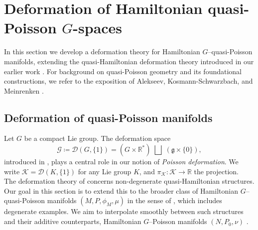 \documentclass[reqno]{amsart}
\theoremstyle{plain}
\theoremstyle{definition}
\newcommand{\R}{\mathbb{R}}
\newcommand{\too}{\longrightarrow}
\begin{document}
\section{Deformation of Hamiltonian quasi-Poisson $G$-spaces} \label{sec 2}
In this section we develop a deformation theory for Hamiltonian $G${--}quasi-Poisson manifolds, extending the quasi-Hamiltonian deformation theory introduced in our earlier work \cite{JMM2025deformations}. For background on quasi-Poisson geometry and its foundational constructions, we refer to the exposition of Alekseev, Kosmann-Schwarzbach, and Meinrenken \cite{alekseev2002quasi}.

\subsection{Deformation of quasi-Poisson manifolds}

Let $G$ be a compact Lie group. The deformation space
\[
\mathcal{G}\coloneqq \mathcal{D}(G,\{1\})=(G\times\mathbb{R}^{*})\;\bigsqcup\;(\mathfrak{g}\times\{0\}),
\]
introduced in \cite{JMM2025deformations}, plays a central role in our notion of \emph{Poisson deformation}. We write $\mathcal{K}=\mathcal{D}(K,\{1\})$ for any Lie group $K$, and $\pi_{\mathcal{K}}: \mathcal{K} \too \R$ the projection.\\
The deformation theory of \cite{JMM2025deformations} concerns non-degenerate quasi-Hamiltonian structures. Our goal in this section is to extend this to the broader class of Hamiltonian $G$--quasi-Poisson manifolds $(M,P,\phi_{M},\mu)$ in the sense of \cite[]{alekseev2002quasi}, which includes degenerate examples. We aim to interpolate smoothly between such structures and their additive counterparts, Hamiltonian $G$--Poisson manifolds $(N,P_{0},\nu)$ \cite[]{alekseev2002quasi}.
\end{document}
